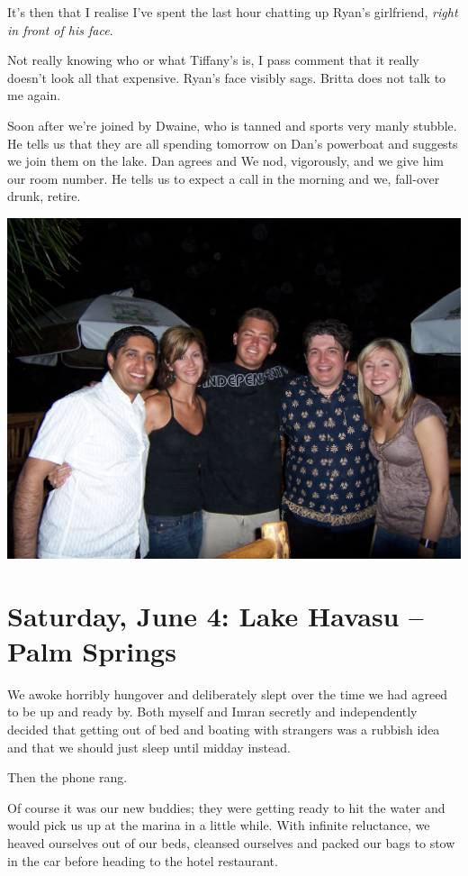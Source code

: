\documentclass[a5paper,titlepage,11pt]{book}
\begin{document}
It's then that I realise I've spent the last hour chatting up Ryan's girlfriend, \emph{right in front of his face}.

Not really knowing who or what Tiffany's is, I pass comment that it really doesn't look all that expensive.  Ryan's face visibly sags.  Britta does not talk to me again.

Soon after we're joined by Dwaine, who is tanned and sports very manly stubble.  He tells us that they are all spending tomorrow on Dan's powerboat and suggests we join them on the lake.  Dan agrees and We nod, vigorously, and we give him our room number.  He tells us to expect a call in the morning and we, fall-over drunk, retire.

\begin{center}\includegraphics[width=\textwidth]{gfx/100_1579}\end{center}

\chapter[Lake Havasu -- Palm Springs]{Saturday, June 4:  Lake Havasu -- Palm Springs}
We awoke horribly hungover and deliberately slept over the time we had agreed to be up and ready by.  Both myself and Imran secretly and independently decided that getting out of bed and boating with strangers was a rubbish idea and that we should just sleep until midday instead.

Then the phone rang.

Of course it was our new buddies; they were getting ready to hit the water and would pick us up at the marina in a little while.  With infinite reluctance, we heaved ourselves out of our beds, cleansed ourselves and packed our bags to stow in the car before heading to the hotel restaurant.
\end{document}
